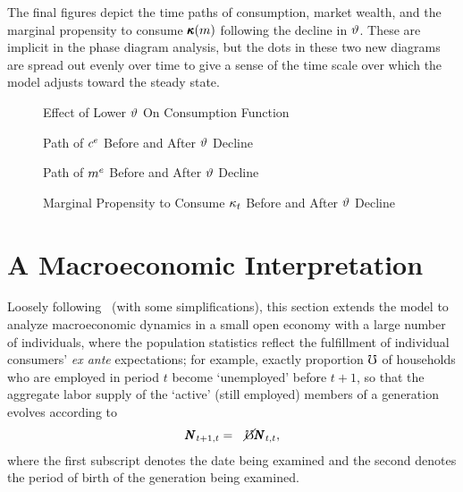 \message{ !name(TractableBufferStock.tex)}\documentclass{handout}
\begin{document}
The final figures depict the time paths of consumption, market wealth,
and the marginal propensity to consume $\pmb{\kappa}(m)$ following the
decline in $\vartheta$.  These are implicit in the phase diagram
analysis, but the dots in these two new diagrams are spread out evenly
over time to give a sense of the time scale over which the model
adjusts toward the steady state.

\begin{figure}
\caption{Effect of Lower $\vartheta$ On Consumption Function}
\label{fig:DecreaseTheta}
\end{figure}

\begin{figure}
\caption{Path of $c^{e}$ Before and After $\vartheta$ Decline}
\label{fig:cPathAfterThetaDrop}
\end{figure}

\begin{figure}
\caption{Path of $m^{e}$ Before and After $\vartheta$ Decline}
\label{fig:mPathAfterThetaDrop}
\end{figure}


\begin{figure}
\caption{Marginal Propensity to Consume $\kappa_{t}$ Before and After $\vartheta$ Decline}
\medskip
{}
\label{fig:MPCPathAfterThetaDrop}
\end{figure}

\section{A Macroeconomic Interpretation}

Loosely following~\cite{cjSOE} (with some simplifications), this section extends the model to analyze macroeconomic dynamics in a
small open economy with a large number of individuals, where the
population statistics reflect the fulfillment of individual consumers'
{\it ex ante} expectations; for example, exactly proportion $\mho$
of households who are employed in period $t$ become `unemployed' before
$t+1$, so that the aggregate labor supply of the `active' (still employed) members of a generation
evolves according to
\begin{eqnarray}
  \pmb{N}_{t+1,t} & = & \cancel{\mho} \pmb{N}_{t,t}
,
\end{eqnarray}
where the first subscript denotes the date being examined and the second denotes
the period of birth of the generation being examined.
\end{document}
